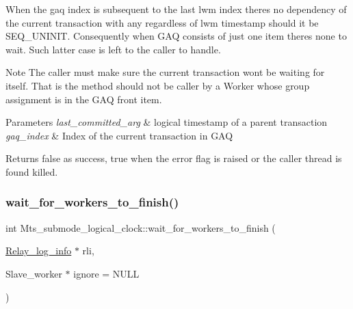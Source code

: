 When the gaq index is subsequent to the last lwm index there\textquotesingle{}s no dependency of the current transaction with any regardless of lwm timestamp should it be S\+E\+Q\+\_\+\+U\+N\+I\+N\+IT. Consequently when G\+AQ consists of just one item there\textquotesingle{}s none to wait. Such latter case is left to the caller to handle.

\begin{DoxyNote}{Note}
The caller must make sure the current transaction won\textquotesingle{}t be waiting for itself. That is the method should not be caller by a Worker whose group assignment is in the G\+AQ front item.
\end{DoxyNote}

\begin{DoxyParams}{Parameters}
{\em last\+\_\+committed\+\_\+arg} & logical timestamp of a parent transaction \\
\hline
{\em gaq\+\_\+index} & Index of the current transaction in G\+AQ \\
\hline
\end{DoxyParams}
\begin{DoxyReturn}{Returns}
false as success, true when the error flag is raised or the caller thread is found killed. 
\end{DoxyReturn}
\mbox{\label{classMts__submode__logical__clock_ad7c1ed46ea9c55f1c4a40cda0c81aa41}} 
\subsubsection{\texorpdfstring{wait\+\_\+for\+\_\+workers\+\_\+to\+\_\+finish()}{wait\_for\_workers\_to\_finish()}}
{\footnotesize\ttfamily int Mts\+\_\+submode\+\_\+logical\+\_\+clock\+::wait\+\_\+for\+\_\+workers\+\_\+to\+\_\+finish (\begin{DoxyParamCaption}\item[{\mbox{\hyperlink{classRelay__log__info}{Relay\+\_\+log\+\_\+info}} $\ast$}]{rli,  }\item[{Slave\+\_\+worker $\ast$}]{ignore = {\ttfamily NULL} }\end{DoxyParamCaption})\hspace{0.3cm}{\ttfamily [virtual]}}

